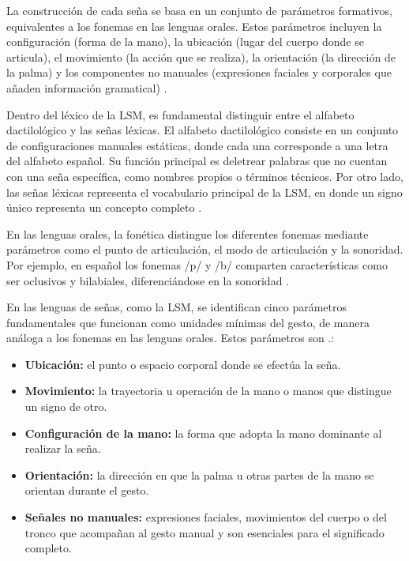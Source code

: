 	La construcción de cada seña se basa en un conjunto de parámetros formativos, equivalentes a los fonemas en las lenguas orales. Estos parámetros incluyen la configuración (forma de la mano), la ubicación (lugar del cuerpo donde se articula), el movimiento (la acción que se realiza), la orientación (la dirección de la palma) y los componentes no manuales (expresiones faciales y corporales que añaden información gramatical) \cite{sep2023lsm}.
	
	Dentro del léxico de la LSM, es fundamental distinguir entre el alfabeto dactilológico y las señas léxicas. El alfabeto dactilológico consiste en un conjunto de configuraciones manuales estáticas, donde cada una corresponde a una letra del alfabeto español. Su función principal es deletrear palabras que no cuentan con una seña específica, como nombres propios o términos técnicos. Por otro lado, las señas léxicas representa el vocabulario principal de la LSM, en donde un signo único representa un concepto completo \cite{cultura_lsm}.
	
	En las lenguas orales, la fonética distingue los diferentes fonemas mediante parámetros como el punto de articulación, el modo de articulación y la sonoridad. Por ejemplo, en español los fonemas /p/ y /b/ comparten características como ser oclusivos y bilabiales, diferenciándose en la sonoridad \cite{pressbooks_lsm}.
	
	En las lenguas de señas, como la LSM, se identifican cinco parámetros fundamentales que funcionan como unidades mínimas del gesto, de manera análoga a los fonemas en las lenguas orales. Estos parámetros son \cite{pressbooks_lsm}.:
	
	\begin{itemize}
		\item \textbf{Ubicación:} el punto o espacio corporal donde se efectúa la seña.
		
		\item \textbf{Movimiento:} la trayectoria u operación de la mano o manos que distingue un signo de otro.
		
		\item \textbf{Configuración de la mano:} la forma que adopta la mano dominante al realizar la seña.
		
		\item \textbf{Orientación:} la dirección en que la palma u otras partes de la mano se orientan durante el gesto.
		
		\item \textbf{Señales no manuales:} expresiones faciales, movimientos del cuerpo o del tronco que acompañan al gesto manual y son esenciales para el significado completo.
	\end{itemize}
	
